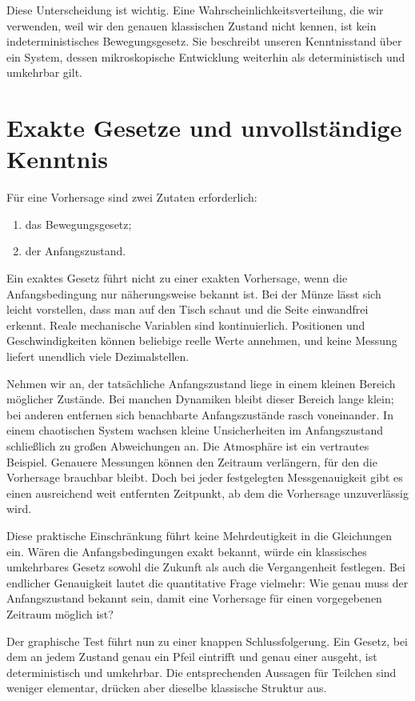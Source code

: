 Diese Unterscheidung ist wichtig. Eine Wahrscheinlichkeitsverteilung, die wir verwenden, weil wir den genauen klassischen Zustand nicht kennen, ist kein indeterministisches Bewegungsgesetz. Sie beschreibt unseren Kenntnisstand über ein System, dessen mikroskopische Entwicklung weiterhin als deterministisch und umkehrbar gilt.

\section{Exakte Gesetze und unvollständige Kenntnis}

Für eine Vorhersage sind zwei Zutaten erforderlich: \begin{enumerate}\item das Bewegungsgesetz; \item der Anfangszustand.\end{enumerate}Ein exaktes Gesetz führt nicht zu einer exakten Vorhersage, wenn die Anfangsbedingung nur näherungsweise bekannt ist. Bei der Münze lässt sich leicht vorstellen, dass man auf den Tisch schaut und die Seite einwandfrei erkennt. Reale mechanische Variablen sind kontinuierlich. Positionen und Geschwindigkeiten können beliebige reelle Werte annehmen, und keine Messung liefert unendlich viele Dezimalstellen.

Nehmen wir an, der tatsächliche Anfangszustand liege in einem kleinen Bereich möglicher Zustände. Bei manchen Dynamiken bleibt dieser Bereich lange klein; bei anderen entfernen sich benachbarte Anfangszustände rasch voneinander. In einem chaotischen System wachsen kleine Unsicherheiten im Anfangszustand schließlich zu großen Abweichungen an. Die Atmosphäre ist ein vertrautes Beispiel. Genauere Messungen können den Zeitraum verlängern, für den die Vorhersage brauchbar bleibt. Doch bei jeder festgelegten Messgenauigkeit gibt es einen ausreichend weit entfernten Zeitpunkt, ab dem die Vorhersage unzuverlässig wird.

Diese praktische Einschränkung führt keine Mehrdeutigkeit in die Gleichungen ein. Wären die Anfangsbedingungen exakt bekannt, würde ein klassisches umkehrbares Gesetz sowohl die Zukunft als auch die Vergangenheit festlegen. Bei endlicher Genauigkeit lautet die quantitative Frage vielmehr: Wie genau muss der Anfangszustand bekannt sein, damit eine Vorhersage für einen vorgegebenen Zeitraum möglich ist?

Der graphische Test führt nun zu einer knappen Schlussfolgerung. Ein Gesetz, bei dem an jedem Zustand genau ein Pfeil eintrifft und genau einer ausgeht, ist deterministisch und umkehrbar. Die entsprechenden Aussagen für Teilchen sind weniger elementar, drücken aber dieselbe klassische Struktur aus.

